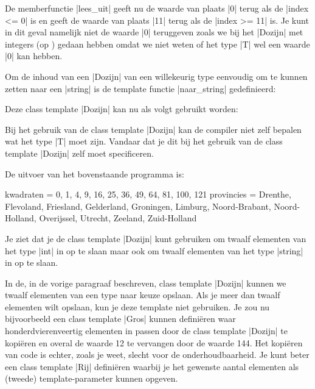 \begin{cpplstShortInline}
De memberfunctie |lees_uit| geeft nu de waarde van plaats |0| terug als de |index <= 0| is en geeft de waarde van plaats |11| terug als de |index >= 11| is.
Je kunt in dit geval namelijk niet de waarde |0| teruggeven zoals we bij het |Dozijn| met integers (op ) gedaan hebben omdat we niet weten of het type |T| wel een waarde |0| kan hebben.

Om de inhoud van een |Dozijn| van een willekeurig type eenvoudig om te kunnen zetten naar een |string| is de template functie |naar_string| gedefinieerd:

Deze class template |Dozijn| kan nu als volgt gebruikt worden:

Bij het gebruik van de class template |Dozijn| kan de compiler niet zelf bepalen wat het type |T| moet zijn.
Vandaar dat je dit bij het gebruik van de class template |Dozijn| zelf moet specificeren.

De uitvoer van het bovenstaande programma is:
\begin{cpplstfragment}[language=]
kwadraten = 0, 1, 4, 9, 16, 25, 36, 49, 64, 81, 100, 121
provincies = Drenthe, Flevoland, Friesland, Gelderland, Groningen, Limburg, Noord-Brabant, Noord-Holland, Overijssel, Utrecht, Zeeland, Zuid-Holland
\end{cpplstfragment}

Je ziet dat je de class template |Dozijn| kunt gebruiken om twaalf elementen van het type |int| in op te slaan maar ook om twaalf elementen van het type |string| in op te slaan.

\label{Rij}
In de, in de vorige paragraaf beschreven, class template |Dozijn| kunnen we twaalf elementen van een type naar keuze opslaan.
Als je meer dan twaalf elementen wilt opslaan, kun je deze template niet gebruiken.
Je zou nu bijvoorbeeld een class template |Gros| kunnen definiëren waar honderdvierenveertig elementen in passen door de class template |Dozijn| te kopiëren en overal de waarde 12 te vervangen door de waarde 144.
Het kopiëren van code is echter, zoals je weet, slecht voor de onderhoudbaarheid.
Je kunt beter een class template |Rij| definiëren waarbij je het gewenste aantal elementen als (tweede) template\hyp{}parameter kunnen opgeven.


\end{cpplstShortInline}
